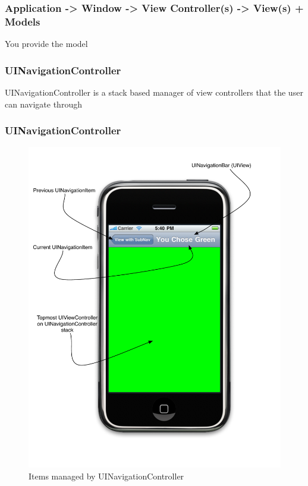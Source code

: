 \documentclass[10pt]{beamer}
\begin{document}
\begin{frame}[fragile]
  \frametitle{Application -> Window -> View Controller(s) -> View(s) + Models}
  You provide the model

\end{frame}

    
\begin{frame}[fragile]
  \frametitle{UINavigationController}
  UINavigationController is a stack based manager of view controllers that the user can navigate through

\end{frame}

\begin{frame}[fragile]
  \frametitle{UINavigationController}
  \begin{figure}[htb]
  \begin{center}

  \includegraphics[scale=0.35]{UIViewExample3.pdf}

  \caption{Items managed by UINavigationController }
  \end{center}
  \end{figure}

\end{frame}
\end{document}
